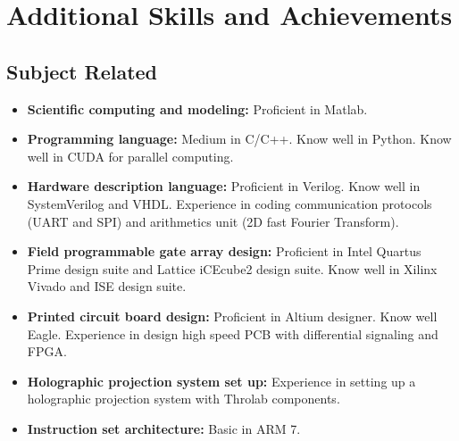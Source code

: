 \documentclass[11pt,a4paper,roman]{moderncv}        %
\begin{document}
\section{Additional Skills and Achievements}
\subsection{Subject Related}
\begin{itemize}
	\item \textbf{Scientific computing and modeling:} Proficient in Matlab.
	\item \textbf{Programming language:} Medium in C/C++. Know well in Python. Know well in CUDA for parallel computing.
	\item \textbf{Hardware description language:} Proficient in Verilog. Know well in SystemVerilog and VHDL. Experience in coding communication protocols (UART and SPI) and arithmetics unit (2D fast Fourier Transform).
	\item \textbf{Field programmable gate array design:} Proficient in Intel Quartus Prime design suite and Lattice iCEcube2 design suite. Know well in Xilinx Vivado and ISE design suite.
	\item \textbf{Printed circuit board design:} Proficient in Altium designer. Know well Eagle. Experience in design high speed PCB with differential signaling and FPGA.
	\item \textbf{Holographic projection system set up:} Experience in setting up a holographic projection system with Throlab components.
	\item \textbf{Instruction set architecture:} Basic in ARM 7.
\end{itemize}
\end{document}
